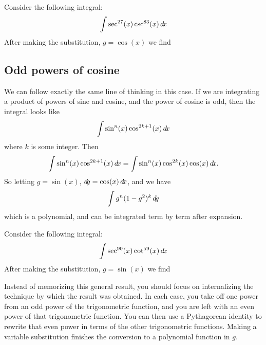 \documentclass{ximera}
\begin{document}
\begin{question}
  Consider the following integral:
  \[
  \int \sec^{27}(x)\csc^{83}(x) \mathop{}\!d\! x
  \]
  After making the substitution, $g = \cos(x)$ we find
  \begin{multipleChoice}
  \end{multipleChoice}
\end{question}



\subsection{Odd powers of cosine}

We can follow exactly the same line of thinking in this case. If we
are integrating a product of powers of sine and cosine, and the power
of cosine is odd, then the integral looks like
\[
\int \sin^n(x) \cos^{2k+1}(x) \mathop{}\!d\! x
\]
where $k$ is some integer. Then
\[
\int \sin^n(x) \cos^{2k+1}(x) \mathop{}\!d\! x = \int \sin^n(x) \cos^{2k}(x) \cos(x) \mathop{}\!d\! x.
\]
So letting $g = \sin(x)$, $\mathop{}\!d\! g =\cos(x) \mathop{}\!d\! x$, and we have 
\[
\int g^n(1-g^2)^k \mathop{}\!d\! g
\]
which is a polynomial, and can be integrated term by term after
expansion.

\begin{question}
  Consider the following integral:
  \[
  \int \sec^{90}(x) \cot^{59}(x)  \mathop{}\!d\! x
  \]
  After making the substitution, $g = \sin(x)$ we find
  \begin{multipleChoice}
  \end{multipleChoice}
\end{question}


\begin{warning}
Instead of memorizing this general result, you should focus on
internalizing the technique by which the result was obtained.  In each
case, you take off one power from an odd power of the trigonometric
function, and you are left with an even power of that trigonometric
function.  You can then use a Pythagorean identity to rewrite that
even power in terms of the other trigonometric functions.  Making a
variable substitution finishes the conversion to a polynomial function
in $g$.
\end{warning}
\end{document}
